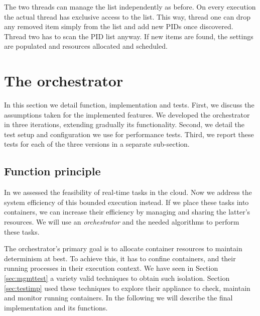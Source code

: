 \documentclass[]{scrartcl}
\begin{document}
The two threads can manage the list independently as before. On every execution the actual thread has exclusive access to the list.
This way, thread one can drop any removed item simply from the list and add new PIDs once discovered. 
Thread two has to scan the PID list anyway.
If new items are found, the settings are populated and resources allocated and scheduled.

\section{The orchestrator}
\label{sec:perftest}


In this section we detail function, implementation and tests.
First, we discuss the assumptions taken for the implemented features. 
We developed the orchestrator in three iterations, extending gradually its functionality.
Second, we detail the test setup and configuration we use for performance tests.
Third, we report these tests for each of the three versions in a separate sub-section. 

\subsection{Function principle}
\label{sub:funcdesc}

In \cite{Hoferetal2019} we assessed the feasibility of real-time tasks in the cloud. 
Now we address the system efficiency of this bounded execution instead.
If we place these tasks into containers, we can increase their efficiency by managing and sharing the latter's resources.
We will use an \emph{orchestrator} and the needed algorithms to perform these tasks.

The orchestrator's primary goal is to allocate container resources to maintain determinism at best.
To achieve this, it has to confine containers, and their running processes in their execution context.
We have seen in Section \ref{sec:mgmttest} a variety valid techniques to obtain such isolation.
Section \ref{sec:testimp} used these techniques to explore their appliance to check, maintain and monitor running containers.
In the following we will describe the final implementation and its functions.
\end{document}
